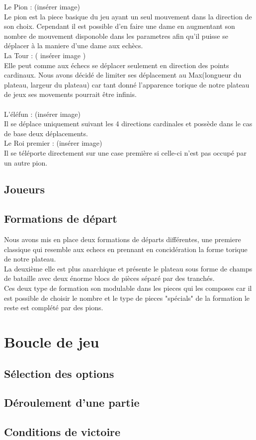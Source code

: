         Le Pion : (insérer image) \\
        Le pion est la piece basique du jeu ayant un seul mouvement dans la direction de son choix. Cependant il est possible d'en faire une dame en augmentant son nombre de mouvement disponoble dans les parametres afin qu'il puisse se déplacer à la maniere d'une dame aux echècs.\\
        
        La Tour : ( insérer image )\\
        Elle peut comme aux échecs se déplacer seulement en direction des points cardinaux. Nous avons décidé de limiter ses déplacement au Max(longueur du plateau, largeur du plateau) car tant donné l'apparence torique de notre plateau de jeux ses movements pourrait être infinis.\\
        \\
        L'éléfun : (insérer image)\\
        Il se déplace uniquement suivant les 4 directions cardinales et possède dans le cas de base deux déplacements.
        \\
        Le Roi premier : (insérer image)\\
        Il se téléporte directement sur une case première si celle-ci n'est pas occupé par un autre pion.

\subsection{Joueurs}
\subsection{Formations de départ}
        Nous avons mis en place deux formations de départs différentes, une premiere classique qui resemble aux echecs en prennant en concidération la forme torique de notre plateau. \\
        La deuxième elle est plus anarchique et présente le plateau sous forme de champs de bataille avec deux énorme blocs de pièces séparé par des tranchés. \\
        Ces deux type de formation son modulable dans les pieces qui les composes car il est possible de choisir le nombre et le type de pieces "spécials" de la formation le reste est complété par des pions. 
        
\section{Boucle de jeu}
\subsection{Sélection des options}
\subsection{Déroulement d'une partie}
\subsection{Conditions de victoire}